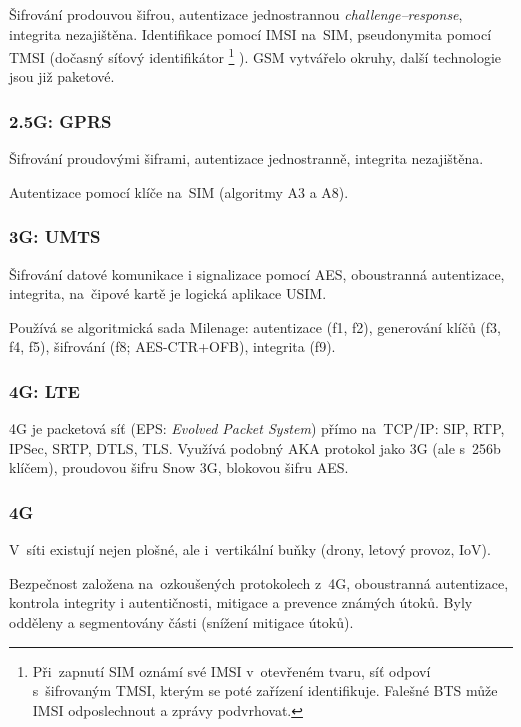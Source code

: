 Šifrování prodouvou šifrou, autentizace jednostrannou \emph{challenge--response}, integrita nezajištěna.
Identifikace pomocí IMSI na~SIM, pseudonymita pomocí TMSI (dočasný síťový identifikátor%
\footnote{Při~zapnutí SIM oznámí své IMSI v~otevřeném tvaru, síť odpoví s~šifrovaným TMSI, kterým se poté zařízení identifikuje. Falešné BTS může IMSI odposlechnout a zprávy podvrhovat.}%
).
GSM vytvářelo okruhy, další technologie jsou již paketové.


\subsubsection{2.5G: GPRS}

Šifrování proudovými šiframi, autentizace jednostranně, integrita nezajištěna.

Autentizace pomocí klíče na~SIM (algoritmy A3 a A8).


\subsubsection{3G: UMTS}

Šifrování datové komunikace i signalizace pomocí AES, oboustranná autentizace, integrita, na~čipové kartě je logická aplikace USIM.

Používá se algoritmická sada Milenage: autentizace (f1, f2), generování klíčů (f3, f4, f5), šifrování (f8; AES-CTR+OFB), integrita (f9).


\subsubsection{4G: LTE}

4G je packetová síť (EPS: \emph{Evolved Packet System}) přímo na~TCP/IP: SIP, RTP, IPSec, SRTP, DTLS, TLS.
Využívá podobný AKA protokol jako 3G (ale s~256b klíčem), proudovou šifru Snow 3G, blokovou šifru AES.


\subsubsection{4G}

V~síti existují nejen plošné, ale i~vertikální buňky (drony, letový provoz, IoV).

Bezpečnost založena na~ozkoušených protokolech z~4G, oboustranná autentizace, kontrola integrity i autentičnosti, mitigace a prevence známých útoků.
Byly odděleny a segmentovány části (snížení mitigace útoků).





